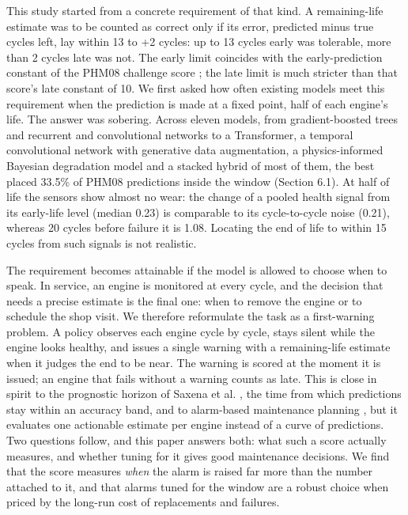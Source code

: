 \documentclass[a4paper,fleqn,doubleblind]{cas-dc}
\begin{document}
This study started from a concrete requirement of that kind. A remaining-life estimate was to be counted as correct only if its error, predicted minus true cycles left, lay within \textminus{}13 to +2 cycles: up to 13 cycles early was tolerable, more than 2 cycles late was not. The early limit coincides with the early-prediction constant of the PHM08 challenge score \cite{saxena2008}; the late limit is much stricter than that score's late constant of 10. We first asked how often existing models meet this requirement when the prediction is made at a fixed point, half of each engine's life. The answer was sobering. Across eleven models, from gradient-boosted trees and recurrent and convolutional networks to a Transformer, a temporal convolutional network with generative data augmentation, a physics-informed Bayesian degradation model and a stacked hybrid of most of them, the best placed 33.5\% of PHM08 predictions inside the window (Section 6.1). At half of life the sensors show almost no wear: the change of a pooled health signal from its early-life level (median 0.23) is comparable to its cycle-to-cycle noise (0.21), whereas 20 cycles before failure it is 1.08. Locating the end of life to within 15 cycles from such signals is not realistic.

The requirement becomes attainable if the model is allowed to choose when to speak. In service, an engine is monitored at every cycle, and the decision that needs a precise estimate is the final one: when to remove the engine or to schedule the shop visit. We therefore reformulate the task as a first-warning problem. A policy observes each engine cycle by cycle, stays silent while the engine looks healthy, and issues a single warning with a remaining-life estimate when it judges the end to be near. The warning is scored at the moment it is issued; an engine that fails without a warning counts as late. This is close in spirit to the prognostic horizon of Saxena et al. \cite{saxena2010}, the time from which predictions stay within an accuracy band, and to alarm-based maintenance planning \cite{depater2022}, but it evaluates one actionable estimate per engine instead of a curve of predictions. Two questions follow, and this paper answers both: what such a score actually measures, and whether tuning for it gives good maintenance decisions. We find that the score measures \textit{when} the alarm is raised far more than the number attached to it, and that alarms tuned for the window are a robust choice when priced by the long-run cost of replacements and failures.
\end{document}
